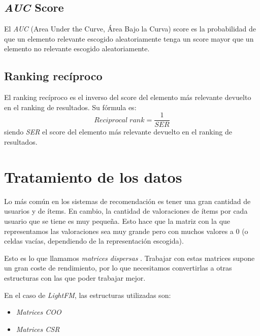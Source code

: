 \subsection{\textit{AUC} Score}\label{auc-score}
El \textit{AUC} (Area Under the Curve, Área Bajo la Curva) score \cite{auc_score} es la probabilidad de que un elemento relevante escogido aleatoriamente tenga un score mayor que un elemento no relevante escogido aleatoriamente.

\subsection{Ranking recíproco}\label{ranking-reciproco}
El ranking recíproco \cite{reciprocal_rank} es el inverso del score del elemento más relevante devuelto en el ranking de resultados. Su fórmula es:
\begin{equation}
Reciprocal\;rank = \frac{1}{SER}
\end{equation}
siendo \textit{SER} el score del elemento más relevante devuelto en el ranking de resultados.

\section{Tratamiento de los datos}\label{tratamiento-datos}
Lo más común en los sistemas de recomendación es tener una gran cantidad de usuarios y de ítems. En cambio, la cantidad de valoraciones de ítems por cada usuario que se tiene es muy pequeña. Esto hace que la matriz con la que representamos las valoraciones sea muy grande pero con muchos valores a 0 (o celdas vacías, dependiendo de la representación escogida).  

Esto es lo que llamamos \textit{matrices dispersas} \cite{wiki:Sparse_matrix}. Trabajar con estas matrices supone un gran coste de rendimiento, por lo que necesitamos convertirlas a otras estructuras con las que poder trabajar mejor.

En el caso de \textit{LightFM}, las estructuras utilizadas son:
\begin{itemize}
\tightlist
\item \textit{Matrices COO}
\item \textit{Matrices CSR}  
\end{itemize}

